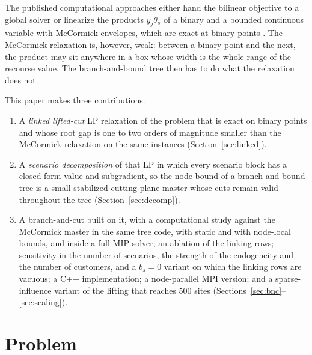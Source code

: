\documentclass[11pt]{article}
\begin{document}
The published computational approaches either hand the bilinear objective to a global solver \cite{hellemo} or
linearize the products $y_j\theta_s$ of a binary and a bounded continuous variable with McCormick envelopes, which
are exact at binary points \cite{basciftci}. The McCormick relaxation is, however, weak: between a binary point and
the next, the product may sit anywhere in a box whose width is the whole range of the recourse value. The
branch-and-bound tree then has to do what the relaxation does not.

This paper makes three contributions.
\begin{enumerate}[nosep]
\item A \emph{linked lifted-cut} LP relaxation of the problem that is exact on binary points and whose root gap is
      one to two orders of magnitude smaller than the McCormick relaxation on the same instances
      (Section~\ref{sec:linked}).
\item A \emph{scenario decomposition} of that LP in which every scenario block has a closed-form value and
      subgradient, so the node bound of a branch-and-bound tree is a small stabilized cutting-plane master whose
      cuts remain valid throughout the tree (Section~\ref{sec:decomp}).
\item A branch-and-cut built on it, with a computational study against the McCormick master in the same tree code,
      with static and with node-local bounds, and inside a full MIP solver; an ablation of the linking rows;
      sensitivity in the number of scenarios, the strength of the endogeneity and the number of customers, and a
      $b_s = 0$ variant on which the linking rows are vacuous; a C++ implementation; a
      node-parallel MPI version; and a sparse-influence variant of the lifting that reaches 500 sites
      (Sections~\ref{sec:bnc}--\ref{sec:scaling}).
\end{enumerate}

\section{Problem}\label{sec:problem}
\end{document}
